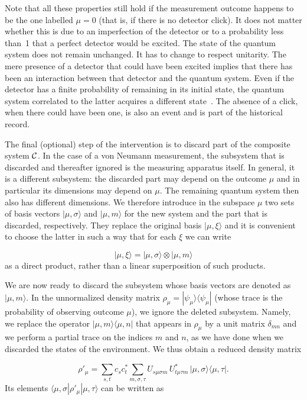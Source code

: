 \documentclass[12pt]{article}
\def\beq{\begin{equation}}
\def\eeq{\end{equation}}
\def\0{\otimes}
\def\6{\langle}
\def\9{\rangle}
\def\cC{$\cal C$}
\begin{document}
Note that all these properties still hold if the measurement outcome
happens to be the one labelled $\mu=0$ (that is, if there is no detector
click). It does not matter whether this is due to an imperfection of the
detector or to a probability less than~1 that a perfect detector would
be excited. The state of the quantum system does not remain unchanged.
It has to change to respect unitarity. The mere presence of a detector
that could have been excited implies that there has been an interaction
between that detector and the quantum system. Even if the detector has a
finite probability of remaining in its initial state, the quantum system
correlated to the latter acquires a different state~\cite{Dicke}. The
absence of a click, when there could have been one, is also an event and
is part of the historical record.

The final (optional) step of the intervention is to discard part of the
composite system \cC. In the case of a von Neumann measurement, the
subsystem that is discarded and thereafter ignored is the measuring
apparatus itself. In general, it is a different subsystem: the discarded
part may depend on the outcome $\mu$ and in particular its dimensions
may depend on $\mu$. The remaining quantum system then also has
different dimensions. We therefore introduce in the subspace $\mu$ two
sets of basis vectors $|\mu,\sigma\9$ and $|\mu,m\9$ for the new system
and the part that is discarded, respectively. They replace the original
basis $|\mu,\xi\9$ and it is convenient to choose the latter in such a
way that for each $\xi$ we can write

\beq |\mu,\xi\9=|\mu,\sigma\9\0|\mu,m\9 \eeq
as a direct product, rather than a linear superposition of such
products.

We are now ready to discard the subsystem whose basis vectors are
denoted as $|\mu,m\9$. In the unnormalized density matrix $\rho_\mu=
|\psi_\mu\9\6\psi_\mu|$ (whose trace is the probability of observing
outcome $\mu$), we ignore the deleted subsystem. Namely, we replace the
operator $|\mu,m\9\6\mu,n|$ that appears in $\rho_\mu$ by a unit matrix
$\delta_{mn}$ and we perform a partial trace on the indices $m$ and $n$,
as we have done when we discarded the states of the environment. We thus
obtain a reduced density matrix

\beq \rho'_\mu=\sum_{s,t}c_sc_t^*\sum_{m,\sigma,\tau}U_{s\mu\sigma m}\,
 U^*_{t\mu\tau m}\,|\mu,\sigma\9\6\mu,\tau|. \eeq
Its elements $\6\mu,\sigma|\rho'_\mu|\mu,\tau\9$ can be written as
\end{document}
